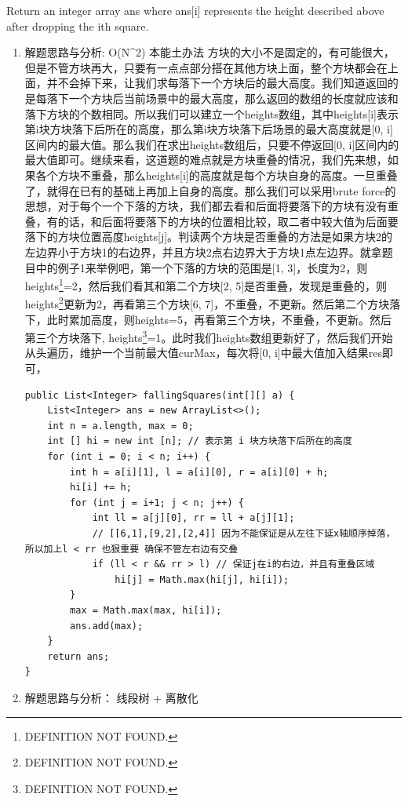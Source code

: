 \documentclass[9pt, b5paaper]{book}
\begin{document}
Return an integer array ans where ans[i] represents the height described above after dropping the ith square.
\begin{enumerate}
\item 解题思路与分析: O(N\^{}2) 本能土办法
\label{sec-1-1-5-1}
方块的大小不是固定的，有可能很大，但是不管方块再大，只要有一点点部分搭在其他方块上面，整个方块都会在上面，并不会掉下来，让我们求每落下一个方块后的最大高度。我们知道返回的是每落下一个方块后当前场景中的最大高度，那么返回的数组的长度就应该和落下方块的个数相同。所以我们可以建立一个heights数组，其中heights[i]表示第i块方块落下后所在的高度，那么第i块方块落下后场景的最大高度就是[0, i]区间内的最大值。那么我们在求出heights数组后，只要不停返回[0, i]区间内的最大值即可。继续来看，这道题的难点就是方块重叠的情况，我们先来想，如果各个方块不重叠，那么heights[i]的高度就是每个方块自身的高度。一旦重叠了，就得在已有的基础上再加上自身的高度。那么我们可以采用brute force的思想，对于每个一个下落的方块，我们都去看和后面将要落下的方块有没有重叠，有的话，和后面将要落下的方块的位置相比较，取二者中较大值为后面要落下的方块位置高度heights[j]。判读两个方块是否重叠的方法是如果方块2的左边界小于方块1的右边界，并且方块2点右边界大于方块1点左边界。就拿题目中的例子1来举例吧，第一个下落的方块的范围是[1, 3]，长度为2，则heights\footnote{DEFINITION NOT FOUND.}=2，然后我们看其和第二个方块[2, 5]是否重叠，发现是重叠的，则heights\footnote{DEFINITION NOT FOUND.}更新为2，再看第三个方块[6, 7]，不重叠，不更新。然后第二个方块落下，此时累加高度，则heights\footnotemark[2]{}=5，再看第三个方块，不重叠，不更新。然后第三个方块落下, heights\footnote{DEFINITION NOT FOUND.}=1。此时我们heights数组更新好了，然后我们开始从头遍历，维护一个当前最大值curMax，每次将[0, i]中最大值加入结果res即可，
\begin{verbatim}
public List<Integer> fallingSquares(int[][] a) {
    List<Integer> ans = new ArrayList<>();
    int n = a.length, max = 0;
    int [] hi = new int [n]; // 表示第 i 块方块落下后所在的高度
    for (int i = 0; i < n; i++) {
        int h = a[i][1], l = a[i][0], r = a[i][0] + h;
        hi[i] += h;
        for (int j = i+1; j < n; j++) {
            int ll = a[j][0], rr = ll + a[j][1];
            // [[6,1],[9,2],[2,4]] 因为不能保证是从左往下延x轴顺序掉落，所以加上l < rr 也狠重要 确保不管左右边有交叠
            if (ll < r && rr > l) // 保证j在i的右边，并且有重叠区域
                hi[j] = Math.max(hi[j], hi[i]);
        }
        max = Math.max(max, hi[i]);
        ans.add(max);
    }
    return ans;
}
\end{verbatim}
\item 解题思路与分析： 线段树 + 离散化
\label{sec-1-1-5-2}


\end{enumerate}
\end{document}
